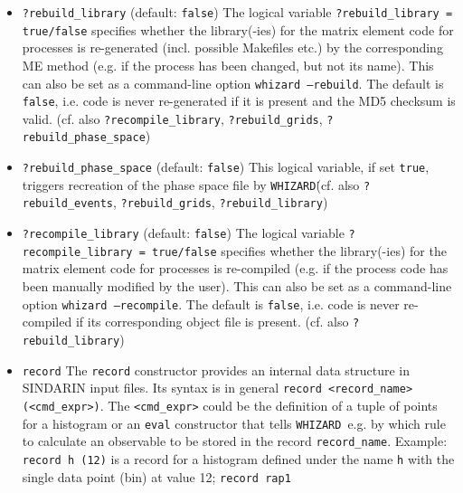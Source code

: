 \documentclass[12pt]{book}
\newcommand{\ttt}[1]{\texttt{#1}}
\newcommand{\whizard}{\texttt{WHIZARD}}
\begin{document}
\begin{itemize}
\ttt{?rebuild\_grids} \qquad (default: \ttt{false}) \newline
The logical variable \ttt{?rebuild\_grids} forces \whizard\ to newly
create the VAMP grids when using VAMP as an integration method, even
if they are already present. (cf. also \ttt{?rebuild\_events},
\ttt{?rebuild\_library}, \ttt{?rebuild\_phase\_space}) 
\item
\ttt{?rebuild\_library} \qquad (default: \ttt{false}) \newline
The logical variable \ttt{?rebuild\_library = true/false} specifies
whether the library(-ies) for the matrix element code for processes is
re-generated (incl. possible Makefiles etc.) by the corresponding ME
method (e.g. if the process has been changed, but not its name). This
can also be set as a command-line option \ttt{whizard --rebuild}. The
default is \ttt{false}, i.e. code is never re-generated if it is
present and the MD5 checksum is valid. 
(cf. also \ttt{?recompile\_library}, \ttt{?rebuild\_grids},
\ttt{?rebuild\_phase\_space}) 
\item
\ttt{?rebuild\_phase\_space} \qquad (default: \ttt{false}) \newline
This logical variable, if set \ttt{true}, triggers recreation of the 
phase space file by \whizard\. (cf. also \ttt{?rebuild\_events},
\ttt{?rebuild\_grids}, \ttt{?rebuild\_library})
\item
\ttt{?recompile\_library} \qquad (default: \ttt{false}) \newline
The logical variable \ttt{?recompile\_library = true/false} specifies
whether the library(-ies) for the matrix element code for processes is
re-compiled (e.g. if the process code has been manually modified by
the user). This can also be set as a command-line option \ttt{whizard
  --recompile}. The default is \ttt{false}, i.e. code is never
re-compiled if its corresponding object file is present. (cf. also
\ttt{?rebuild\_library}) 
\item
\ttt{record} \newline
The \ttt{record} constructor provides an internal data structure in
SINDARIN input files. Its syntax is in general \ttt{record
  <record\_name> (<cmd\_expr>)}. The \ttt{<cmd\_expr>} could be the
definition of a tuple of points for a histogram or an \ttt{eval}
constructor that tells \whizard\ e.g. by which rule to calculate an
observable to be stored in the record \ttt{record\_name}. Example: 
\ttt{record h (12)} is a record for a histogram defined under the name
\ttt{h} with the single data point (bin) at value 12; \ttt{record rap1
}
\end{itemize}
\end{document}
